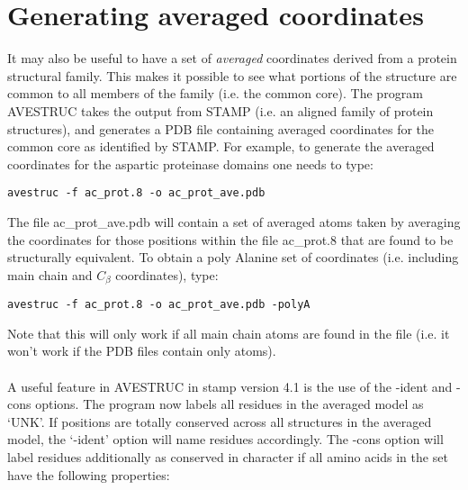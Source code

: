 \section{Generating averaged coordinates}

It may also be useful to have a set of {\em averaged} coordinates derived 
from a protein structural family.  This makes it possible to see what 
portions of the structure are common to all members of the family (i.e. 
the common core).  The program AVESTRUC takes the output from STAMP 
(i.e. an aligned family of protein structures), and generates a PDB file 
containing averaged coordinates for the common core as identified by 
STAMP.  For example, to generate the averaged coordinates for the 
aspartic proteinase domains one needs to type:\\

\begin{scriptsize}\begin{verbatim}
avestruc -f ac_prot.8 -o ac_prot_ave.pdb
\end{verbatim} \end{scriptsize}

The file ac\_prot\_ave.pdb will contain a set of averaged \Cal atoms taken 
by averaging the coordinates for those positions within the file 
ac\_prot.8 that are found to be structurally equivalent.  To obtain a poly 
Alanine set of coordinates (i.e. including main chain and $C_{\beta}$ 
coordinates), type:\\

\begin{scriptsize}\begin{verbatim}
avestruc -f ac_prot.8 -o ac_prot_ave.pdb -polyA
\end{verbatim} \end{scriptsize}

Note that this will only work if all main chain atoms are found in the file
(i.e. it won't work if the PDB files contain only \Cal atoms).\\
\\
A useful feature in AVESTRUC in stamp version 4.1 is the use of the -ident
and -cons options.  The program now labels all residues in the averaged model 
as `UNK'.  If positions are totally conserved across all structures in the
averaged model, the `-ident' option will name residues accordingly.  The -cons
option will label residues additionally as conserved in character if all
amino acids in the set have the following properties:\\

